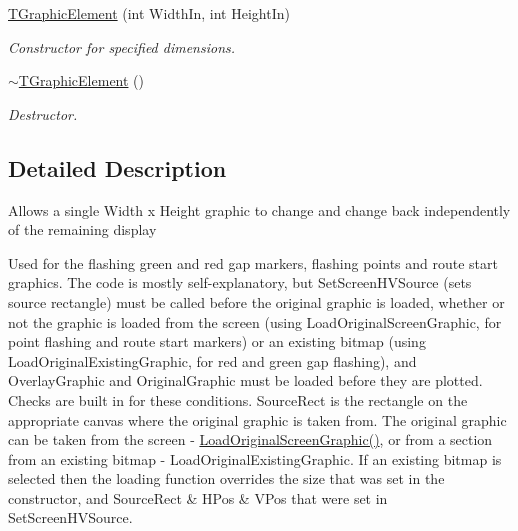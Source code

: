 \begin{DoxyCompactItemize}
\mbox{\label{class_t_graphic_element_a3d9336aecdb5c05c0d96485d896c8d24}} 
\mbox{\hyperlink{class_t_graphic_element_a3d9336aecdb5c05c0d96485d896c8d24}{T\+Graphic\+Element}} (int Width\+In, int Height\+In)
\begin{DoxyCompactList}\small\item\em Constructor for specified dimensions. \end{DoxyCompactList}\item 
\mbox{\label{class_t_graphic_element_af7a475400bc15a5ab41bf1b3d345dc31}} 
\mbox{\hyperlink{class_t_graphic_element_af7a475400bc15a5ab41bf1b3d345dc31}{$\sim$\+T\+Graphic\+Element}} ()
\begin{DoxyCompactList}\small\item\em Destructor. \end{DoxyCompactList}\end{DoxyCompactItemize}


\subsection{Detailed Description}
Allows a single Width x Height graphic to change and change back independently of the remaining display

Used for the flashing green and red gap markers, flashing points and route start graphics. The code is mostly self-\/explanatory, but Set\+Screen\+H\+V\+Source (sets source rectangle) must be called before the original graphic is loaded, whether or not the graphic is loaded from the screen (using Load\+Original\+Screen\+Graphic, for point flashing and route start markers) or an existing bitmap (using Load\+Original\+Existing\+Graphic, for red and green gap flashing), and Overlay\+Graphic and Original\+Graphic must be loaded before they are plotted. Checks are built in for these conditions. Source\+Rect is the rectangle on the appropriate canvas where the original graphic is taken from. The original graphic can be taken from the screen -\/ \mbox{\hyperlink{class_t_graphic_element_ac12f60cb52eefdc86eaa504419eb138d}{Load\+Original\+Screen\+Graphic()}}, or from a section from an existing bitmap -\/ Load\+Original\+Existing\+Graphic. If an existing bitmap is selected then the loading function overrides the size that was set in the constructor, and Source\+Rect \& H\+Pos \& V\+Pos that were set in Set\+Screen\+H\+V\+Source. 

